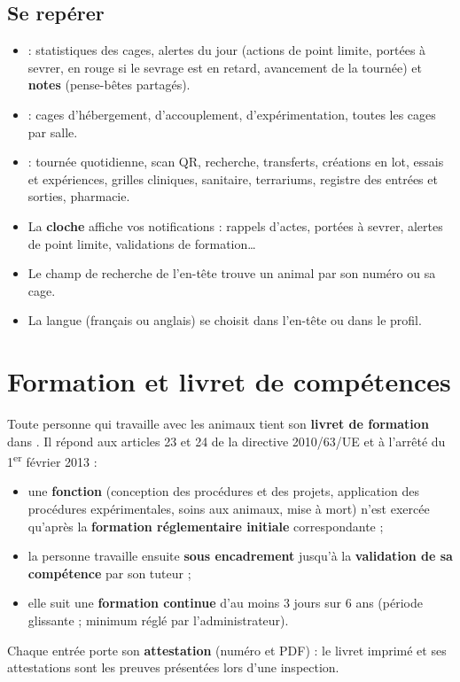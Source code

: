\documentclass[11pt,a4paper]{article}
\begin{document}
\subsection{Se repérer}
\begin{itemize}
  \item {} : statistiques des cages, alertes du jour (actions
    de point limite, portées à sevrer, en rouge si le sevrage est en retard,
    avancement de la tournée) et \textbf{notes} (pense-bêtes partagés).
  \item {} : cages d'hébergement, d'accouplement,
    d'expérimentation, toutes les cages par salle.
  \item {} : tournée quotidienne, scan QR, recherche, transferts,
    créations en lot, essais et expériences, grilles cliniques, sanitaire,
    terrariums, registre des entrées et sorties, pharmacie.
  \item La \textbf{cloche} affiche vos notifications : rappels d'actes,
    portées à sevrer, alertes de point limite, validations de formation…
  \item Le champ de recherche de l'en-tête trouve un animal par son numéro ou
    sa cage.
  \item La langue (français ou anglais) se choisit dans l'en-tête ou dans le
    profil.
\end{itemize}

\section{Formation et livret de compétences}\label{sec:livret}
Toute personne qui travaille avec les animaux tient son \textbf{livret de
formation} dans . Il répond aux
articles 23 et 24 de la directive 2010/63/UE et à l'arrêté du 1\textsuperscript{er}
février 2013 :
\begin{itemize}
  \item une \textbf{fonction} (conception des procédures et des projets,
    application des procédures expérimentales, soins aux animaux, mise à mort)
    n'est exercée qu'après la \textbf{formation réglementaire initiale}
    correspondante ;
  \item la personne travaille ensuite \textbf{sous encadrement} jusqu'à la
    \textbf{validation de sa compétence} par son tuteur ;
  \item elle suit une \textbf{formation continue} d'au moins 3 jours sur
    6 ans (période glissante ; minimum réglé par l'administrateur).
\end{itemize}
Chaque entrée porte son \textbf{attestation} (numéro et PDF) : le livret
imprimé et ses attestations sont les preuves présentées lors d'une
inspection.
\end{document}

